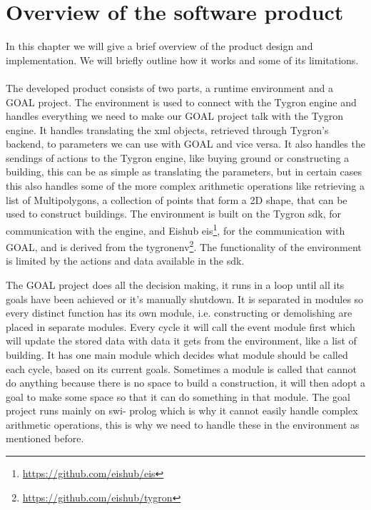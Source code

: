\chapter{Overview of the software product}\label{sec:overview}
In this chapter we will give a brief overview of the product design and implementation. We will briefly outline how it works and some of its limitations.
\\
\\
The developed product consists of two parts, a runtime environment and a GOAL project.
The environment is used to connect with the Tygron engine and handles everything we need to make our GOAL project talk with the Tygron engine.
It handles translating the xml objects, retrieved through Tygron's backend, to parameters we can use with GOAL and vice versa.
It also handles the sendings of actions to the Tygron engine, like buying ground or constructing a building, this can be as simple as translating the parameters, but in certain cases this also handles some of the more complex arithmetic operations like retrieving a list of Multipolygons, a collection of points that form a 2D shape, that can be used to construct buildings.
The environment is built on the Tygron sdk, for communication with the engine, and Eishub eis\footnote{\url{https://github.com/eishub/eis}}, for the communication with GOAL, and is derived from the tygronenv\footnote{\url{https://github.com/eishub/tygron}}.
The functionality of the environment is limited by the actions and data available in the sdk.

The GOAL project does all the decision making, it runs in a loop until all its goals have been achieved or it's manually shutdown.
It is separated in modules so every distinct function has its own module, i.e. constructing or demolishing are placed in separate modules.
Every cycle it will call the event module first which will update the stored data with data it gets from the environment, like a list of building.
It has one main module which decides what module should be called each cycle, based on its current goals.
Sometimes a module is called that cannot do anything because there is no space to build a construction, it will then adopt a goal to make some space so that it can do something in that module.
The goal project runs mainly on swi- prolog which is why it cannot easily handle complex arithmetic operations, this is why we need to handle these in the environment as mentioned before.
